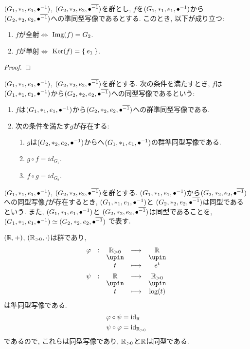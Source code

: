 \begin{prop}
  $(G_1,\ast_1,e_1,{\bullet}^{-1})$,
  $(G_2,\ast_2,e_2,{\bullet}^{\overline{-1}})$を群とし,
  $f$を$(G_1,\ast_1,e_1,{\bullet}^{-1})$から$(G_2,\ast_2,e_2,{\bullet}^{\overline{-1}})$への準同型写像であるとする.
  このとき, 以下が成り立つ:
  \begin{enumerate}
  \item $f$が全射$\iff$ $\operatorname{Img}(f)=G_2$.
  \item $f$が単射$\iff$ $\operatorname{Ker}(f)=\Set{e_1}$.
  \end{enumerate}
\end{prop}
\begin{proof}\end{proof}


\begin{definition}
  $(G_1,\ast_1,e_1,{\bullet}^{-1})$,
  $(G_2,\ast_2,e_2,{\bullet}^{\overline{-1}})$を群とする.
  次の条件を満たすとき,
  $f$は$(G_1,\ast_1,e_1,{\bullet}^{-1})$から$(G_2,\ast_2,e_2,{\bullet}^{\overline{-1}})$への同型写像であるという:
  \begin{enumerate}
    \item $f$は$(G_1,\ast_1,e_1,{\bullet}^{-1})$から$(G_2,\ast_2,e_2,{\bullet}^{\overline{-1}})$への群準同型写像である.
    \item 次の条件を満たす$g$が存在する:
      \begin{enumerate}
      \item $g$は$(G_2,\ast_2,e_2,{\bullet}^{\overline{-1}})$からへ$(G_1,\ast_1,e_1,{\bullet}^{-1})$の群準同型写像である.
      \item $g\circ f = id_{G_1}$.
      \item $f\circ g = id_{G_2}$.
      \end{enumerate}
  \end{enumerate}
\end{definition}
\begin{definition}
  $(G_1,\ast_1,e_1,{\bullet}^{-1})$,
  $(G_2,\ast_2,e_2,{\bullet}^{\overline{-1}})$を群とする.
  $(G_1,\ast_1,e_1,{\bullet}^{-1})$から$(G_2,\ast_2,e_2,{\bullet}^{\overline{-1}})$への同型写像$f$が存在するとき,
  $(G_1,\ast_1,e_1,{\bullet}^{-1})$と
  $(G_2,\ast_2,e_2,{\bullet}^{\overline{-1}})$は同型であるという.
  また,
  $(G_1,\ast_1,e_1,{\bullet}^{-1})$と
  $(G_2,\ast_2,e_2,{\bullet}^{\overline{-1}})$は同型であることを,
  $(G_1,\ast_1,e_1,{\bullet}^{-1})\simeq(G_2,\ast_2,e_2,{\bullet}^{\overline{-1}})$
  で表す.
\end{definition}

\begin{example}
  $(\mathbb{R},+)$,
  $(\mathbb{R}_{>0},\cdot)$は群であり,
  \begin{align*}
    \shazo{\varphi}{\RR_{>0}}{\RR}
    {t}{e^t}\\
    \shazo{\psi}{\RR}{\RR_{>0}}
    {t}{\log(t)}
  \end{align*}
  は準同型写像である.
  \begin{align*}
    \varphi \circ \psi &= \operatorname{id}_{\mathbb{R}}\\
    \psi \circ \varphi &= \operatorname{id}_{\mathbb{R}_{>0}}
  \end{align*}
  であるので, これらは同型写像であり,
  $\mathbb{R}_{>0}$と$\mathbb{R}$は同型である.
\end{example}

